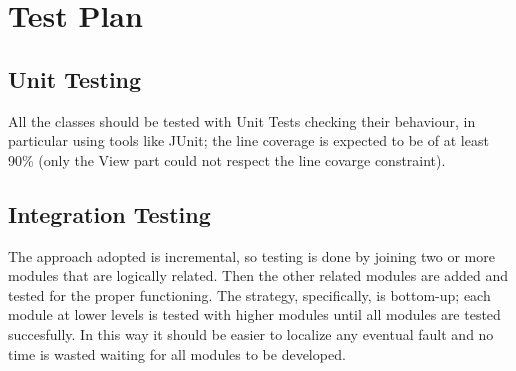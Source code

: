 \documentclass[../DD.tex]{subfiles}
\begin{document}

\section{Test Plan\label{5.4}}

\subsection{Unit Testing\label{5.4.1}}
All the classes should be tested with Unit Tests checking their behaviour, in particular using tools like JUnit; the line coverage is expected to be of at least 90\% (only the View part could not respect the line covarge constraint).


\subsection{Integration Testing\label{5.4.2}}

The approach adopted is incremental, so testing is done by joining two or more modules that are logically related. Then the other related modules are added and tested for the proper functioning. The strategy, specifically, is bottom-up; each module at lower levels is tested with higher modules until all modules are tested succesfully. In this way it should be easier to localize any eventual fault and no time is wasted waiting for all modules to be developed.
\end{document}
